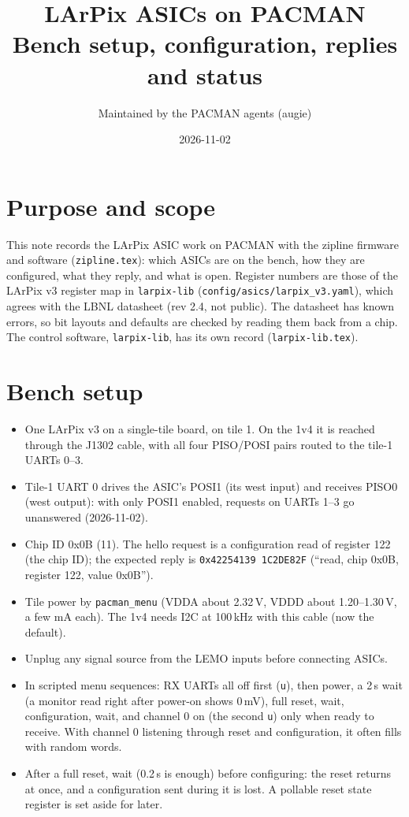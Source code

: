 \documentclass[11pt]{article}
\title{LArPix ASICs on PACMAN\\[2pt]
  \large Bench setup, configuration, replies and status}
\author{Maintained by the PACMAN agents (augie)}
\date{2026-11-02}
\newcommand{\h}[1]{\texttt{#1}}
\begin{document}
\maketitle
\sloppy

\section{Purpose and scope}

This note records the LArPix ASIC work on PACMAN with the zipline firmware and software (\h{zipline.tex}): which
ASICs are on the bench, how they are configured, what they reply, and what is open.  Register numbers are those of
the LArPix v3 register map in \h{larpix-lib} (\h{config/asics/larpix\_v3.yaml}), which agrees with the LBNL datasheet
(rev 2.4, not public).  The datasheet has known errors, so bit layouts and defaults are checked by reading them
back from a chip.  The control software, \h{larpix-lib}, has its own record (\h{larpix-lib.tex}).

\section{Bench setup}

\begin{itemize}
\item One LArPix v3 on a single-tile board, on tile 1.  On the 1v4 it is reached through the J1302 cable, with all
  four PISO/POSI pairs routed to the tile-1 UARTs 0--3.
\item Tile-1 UART 0 drives the ASIC's POSI1 (its west input) and receives PISO0 (west output): with only POSI1
  enabled, requests on UARTs 1--3 go unanswered (2026-11-02).
\item Chip ID 0x0B (11).  The hello request is a configuration read of register 122 (the chip ID); the expected reply
  is \h{0x42254139 1C2DE82F} (``read, chip 0x0B, register 122, value 0x0B'').
\item Tile power by \h{pacman\_menu} (VDDA about 2.32\,V, VDDD about 1.20--1.30\,V, a few mA each).  The 1v4 needs I2C
  at 100\,kHz with this cable (now the default).
\item Unplug any signal source from the LEMO inputs before connecting ASICs.
\item In scripted menu sequences: RX UARTs all off first (\h{u}), then power, a 2\,s wait (a monitor read right
  after power-on shows 0\,mV), full reset, wait, configuration, wait, and channel 0 on (the second \h{u}) only when
  ready to receive.  With channel 0 listening through reset and configuration, it often fills with random words.
\item After a full reset, wait (0.2\,s is enough) before configuring: the reset returns at once, and a configuration
  sent during it is lost.  A pollable reset state register is set aside for later.
\end{itemize}
\end{document}
